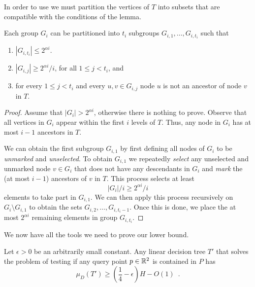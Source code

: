 \documentclass[charterfonts,lotsofwhite]{patmorin}
\begin{document}
In order to use  we must partition the vertices of
$T$ into subsets that are compatible with the conditions of the lemma.

\begin{lem}
Each group $G_i$ can be partitioned into $t_i$ subgroups
$G_{i,1},\ldots,G_{i,t_i}$ such that
\begin{enumerate}
\item $|G_{i,t_i}|\le 2^{\alpha i}$.

\item $|G_{i,j}| \ge 2^{\alpha i} / i$, for all $1\le j< t_i$, and

\item for every $1\le j< t_i$ and every $u,v\in G_{i,j}$ node $u$ is
not an ancestor of node $v$ in $T$. 

\end{enumerate}
\end{lem}

\begin{proof}
Assume that $|G_i|> 2^{\alpha i}$, otherwise there is nothing to
prove.  Observe that all vertices in $G_i$ appear within the first $i$
levels of $T$.  Thus, any node in $G_i$ has at most $i-1$ ancestors in
$T$.  

We can obtain the first subgroup $G_{i,1}$ by first defining all nodes of
$G_i$ to be \emph{unmarked} and \emph{unselected}.  To obtain
$G_{i,1}$ we repeatedly \emph{select} any unselected and unmarked
node $v\in G_i$ that does not have any descendants in $G_i$ and
\emph{mark} the (at most $i-1$) ancestors of $v$ in $T$.  This
process selects at least
\[
   |G_i|/i \ge 2^{\alpha i}/i
\] 
elements to take part in $G_{i,1}$.  We can then apply this process
recursively on $G_i\setminus G_{i,1}$ to obtain the sets
$G_{i,2},\ldots,G_{i,t_i-1}$.  Once this is done, we place the at most
$2^{\alpha i}$ remaining elements in group $G_{i,t_i}$.
\end{proof}

We now have all the tools we need to prove our lower bound.

\begin{thm}
Let $\epsilon > 0$ be an arbitrarily small constant.
Any linear decision tree $T'$ that solves the problem of testing 
if any query point 
$p\in\mathbb{R}^2$ is contained in $P$ has
\[
   \mu_D(T') \ge \left(\frac{1}{4}-\epsilon\right)H - O(1) \enspace .
\]
\end{thm}
\end{document}
